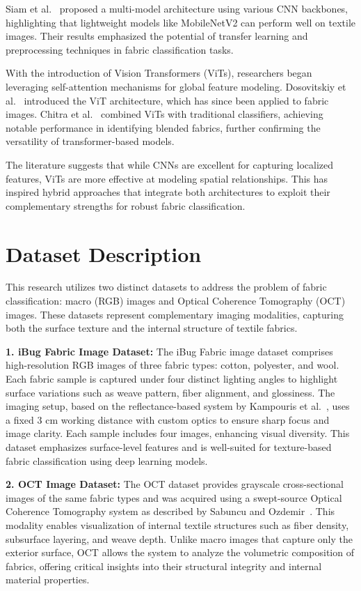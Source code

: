 Siam et al.~\cite{siam2021textilenet} proposed a multi-model architecture using various CNN backbones, highlighting that lightweight models like MobileNetV2 can perform well on textile images. Their results emphasized the potential of transfer learning and preprocessing techniques in fabric classification tasks.

With the introduction of Vision Transformers (ViTs), researchers began leveraging self-attention mechanisms for global feature modeling. Dosovitskiy et al.~\cite{dosovitskiy2020vit} introduced the ViT architecture, which has since been applied to fabric images. Chitra et al.~\cite{chitra2022vit} combined ViTs with traditional classifiers, achieving notable performance in identifying blended fabrics, further confirming the versatility of transformer-based models.

The literature suggests that while CNNs are excellent for capturing localized features, ViTs are more effective at modeling spatial relationships. This has inspired hybrid approaches that integrate both architectures to exploit their complementary strengths for robust fabric classification.

\section*{Dataset Description}

This research utilizes two distinct datasets to address the problem of fabric classification: macro (RGB) images and Optical Coherence Tomography (OCT) images. These datasets represent complementary imaging modalities, capturing both the surface texture and the internal structure of textile fabrics.

\textbf{1. iBug Fabric Image Dataset:}  
The iBug Fabric image dataset comprises high-resolution RGB images of three fabric types: cotton, polyester, and wool. Each fabric sample is captured under four distinct lighting angles to highlight surface variations such as weave pattern, fiber alignment, and glossiness. The imaging setup, based on the reflectance-based system by Kampouris et al.~\cite{kampouris2022microgeometry}, uses a fixed 3 cm working distance with custom optics to ensure sharp focus and image clarity. Each sample includes four images, enhancing visual diversity. This dataset emphasizes surface-level features and is well-suited for texture-based fabric classification using deep learning models.

\textbf{2. OCT Image Dataset:}  
The OCT dataset provides grayscale cross-sectional images of the same fabric types and was acquired using a swept-source Optical Coherence Tomography system as described by Sabuncu and Ozdemir~\cite{sabuncu2020oct}. This modality enables visualization of internal textile structures such as fiber density, subsurface layering, and weave depth. Unlike macro images that capture only the exterior surface, OCT allows the system to analyze the volumetric composition of fabrics, offering critical insights into their structural integrity and internal material properties.

